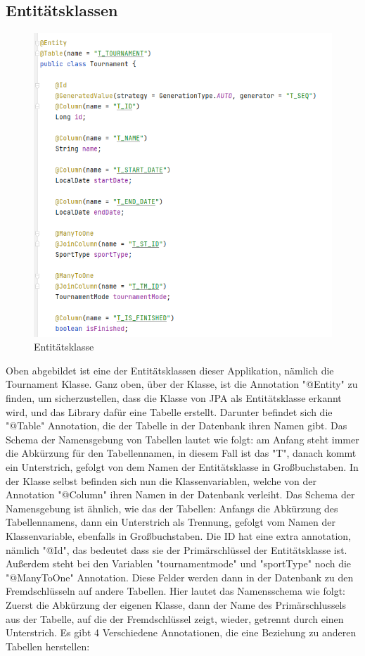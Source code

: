 \subsection{Entitätsklassen}

\begin{figure}[H]
    \includegraphics[scale=0.8]{pics/entity_class.png}
    \caption{Entitätsklasse}
\end{figure}

Oben abgebildet ist eine der Entitätsklassen dieser Applikation, nämlich die Tournament Klasse. Ganz oben, über der Klasse, ist die Annotation "@Entity" zu finden, um sicherzustellen, dass die Klasse von JPA als Entitätsklasse erkannt wird, 
und das Library dafür eine Tabelle erstellt. Darunter befindet sich die "@Table" Annotation, die der Tabelle in der Datenbank ihren Namen gibt. Das Schema der Namensgebung von Tabellen lautet wie folgt: 
am Anfang steht immer die Abkürzung für den Tabellennamen, in diesem Fall ist das "T", danach kommt ein Unterstrich, gefolgt von dem Namen der Entitätsklasse in Großbuchstaben. 
In der Klasse selbst befinden sich nun die Klassenvariablen, welche von der Annotation "@Column" ihren Namen in der Datenbank verleiht. Das Schema der Namensgebung ist ähnlich, wie das der Tabellen: 
Anfangs die Abkürzung des Tabellennamens, dann ein Unterstrich als Trennung, gefolgt vom Namen der Klassenvariable, ebenfalls in Großbuchstaben. Die ID hat eine extra annotation, nämlich "@Id", 
das bedeutet dass sie der Primärschlüssel der Entitätsklasse ist. Außerdem steht bei den Variablen "tournamentmode" und "sportType" noch die "@ManyToOne" Annotation. 
Diese Felder werden dann in der Datenbank zu den Fremdschlüsseln auf andere Tabellen. Hier lautet das Namensschema wie folgt: Zuerst die Abkürzung der eigenen Klasse, 
dann der Name des Primärschlussels aus der Tabelle, auf die der Fremdschlüssel zeigt, wieder, getrennt durch einen Unterstrich.
Es gibt 4 Verschiedene Annotationen, die eine Beziehung zu anderen Tabellen herstellen:

